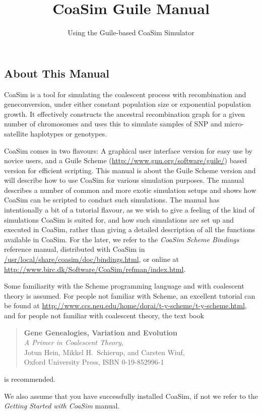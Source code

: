 \documentclass{manual}
\title{CoaSim Guile Manual}
\subtitle{Using the Guile-based CoaSim Simulator}
\begin{document}
\begin{empfile}


\section{About This Manual}
\label{sec:about-this-manual}

CoaSim is a tool for simulating the coalescent process with
recombination and geneconversion, under either constant population
size or exponential population growth.  It effectively constructs the
ancestral recombination graph for a given number of chromosomes and
uses this to simulate samples of SNP and micro-satellite haplotypes or
genotypes.

CoaSim comes in two flavours: A graphical user interface version for
easy use by novice users, and a Guile Scheme
(\url{http://www.gnu.org/software/guile/}) based version for efficient
scripting.  This manual is about the Guile Scheme version and will
describe how to use CoaSim for various simulation purposes.  The
manual describes a number of common and more exotic simulation setups
and shows how CoaSim can be scripted to conduct such simulations.  The
manual has intentionally a bit of a tutorial flavour, as we wish to
give a feeling of the kind of simulations CoaSim is suited for, and
how such simulations are set up and executed in CoaSim, rather than
giving a detailed description of all the functions available in
CoaSim.  For the later, we refer to the \emph{CoaSim Scheme Bindings}
reference manual, distributed with CoaSim in
\url{/usr/local/share/coasim/doc/bindings.html}, or online at
\url{http://www.birc.dk/Software/CoaSim/refman/index.html}.

Some familiarity with the Scheme programming language and with
coalescent theory is assumed.  For people not familiar with Scheme, an
excellent tutorial can be found at
\url{http://www.ccs.neu.edu/home/dorai/t-y-scheme/t-y-scheme.html},
and for people not familiar with coalescent theory, the text book
\begin{quote}
  \textbf{Gene Genealogies, Variation and Evolution}\\
  \textit{A Primer in Coalescent Theory},\\
  Jotun Hein, Mikkel H.\ Schierup, and Carsten Wiuf,\\
  Oxford University Press, ISBN 0-19-852996-1  
\end{quote}
is recommended.

We also assume that you have successfully installed CoaSim, if not we
refer to the \emph{Getting Started with CoaSim} manual.



\end{empfile}
\end{document}
